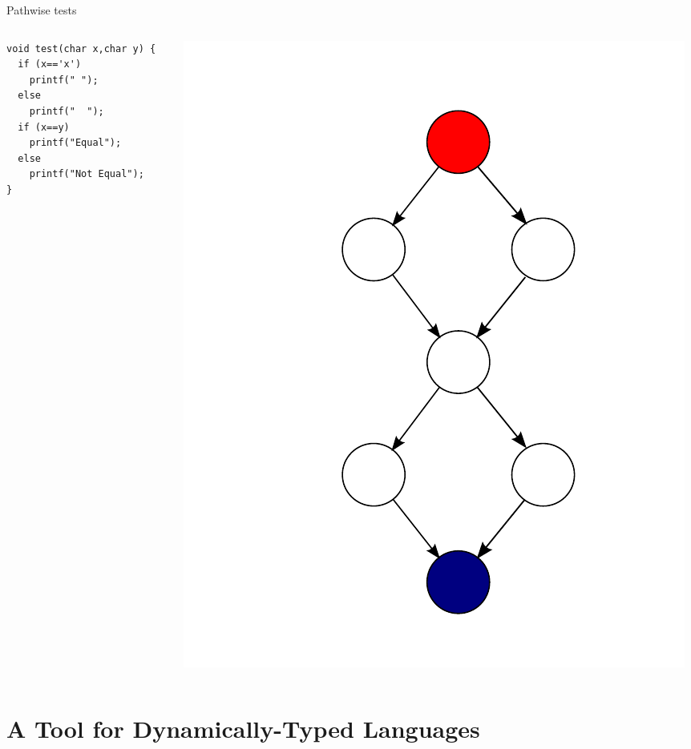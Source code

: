 \documentclass{beamer}
\begin{document}
\begin{frame}[fragile]{Pathwise tests}
  \begin{columns}
    \begin{column}{0.5\textwidth}
      \begin{verbatim}
void test(char x,char y) {
  if (x=='x')
    printf(" ");
  else
    printf("  ");
  if (x==y)
    printf("Equal");
  else
    printf("Not Equal");
}
      \end{verbatim}
    \end{column}
    \begin{column}{0.5\textwidth}
      \includegraphics[height=\textheight]{Control_flow_graph}
    \end{column}
  \end{columns}
\end{frame}


\section{A Tool for Dynamically-Typed Languages}
\end{document}
